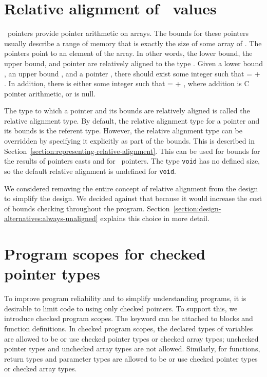 \section{Relative alignment of \arrayptr\ values}
\label{section:relative-alignment}

\arrayptrT\ pointers provide
pointer arithmetic on arrays. The bounds for these pointers usually
describe a range of memory that is exactly the size of some array of .
The pointers point to an element of the array. In other words, the lower
bound, the upper bound, and pointer are  relatively aligned to the type
. Given a lower bound , an upper bound , and a
pointer , there should exist some integer  such that
 =  + . In addition, there is either some
integer  such that  =  + ,
where addition is C pointer arithmetic, or  is null.

The type to which a pointer and its bounds are relatively aligned is
called the relative alignment type. By default, the relative alignment
type for a pointer and its bounds is the referent type. However, the
relative alignment type can be overridden by specifying it explicitly as
part of the bounds.  This is described in 
Section~\ref{section:representing-relative-alignment}.
This can be used for bounds for the results of pointers casts and 
for  \arrayptrvoid\ pointers. The type
\texttt{void} has no defined size, so the default relative alignment is
undefined for \texttt{void}.

We considered removing the entire concept of relative alignment from the
design to simplify the design.  We decided against that because it would 
increase the cost of bounds checking throughout the program.  
Section~\ref{section:design-alternatives:always-unaligned} explains
this choice in more detail.

\section{Program scopes for checked pointer types}

To improve program reliability and to simplify understanding programs,
it is desirable to limit code to using only checked pointers. To support
this, we introduce checked program scopes. The  keyword
can be attached to blocks and function definitions. In checked program
scopes, the declared types of variables are allowed to be or use
checked pointer types or checked array types; unchecked pointer types
and unchecked array types are not allowed.  Similarly, for functions,
return types and parameter types are allowed to be or use checked pointer
types or checked array types.  

